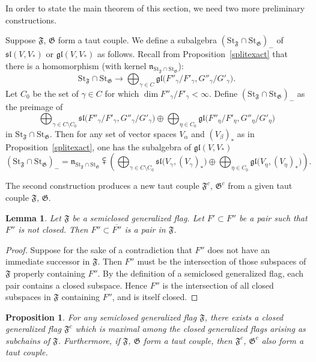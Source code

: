 \documentclass{article}
\newcommand {\St} {\mathrm{St}}
\def\gl{\mathfrak {gl}}
\def\n{\mathfrak {n}}
\def\sl{\mathfrak{sl}}
\def\F{\mathfrak{F}}
\def\G{\mathfrak{G}}
\newtheorem{lemma}[thm]{Lemma}
\newtheorem{prop}[thm]{Proposition}
\begin{document}
In order to state the main theorem of this section, we need two more preliminary constructions. 

Suppose $\F$, $\G$ form a taut couple.  
We define a subalgebra $(\St_\F \cap \St_\G)_-$ of $\sl(V,V_*)$ or $\gl(V,V_*)$ as follows.  Recall from Proposition~\ref{splitexact} that there is a homomorphism (with kernel $\n_{\St_\F \cap \St_\G}$):  $$\St_\F \cap \St_\G \longrightarrow \bigoplus_{\gamma \in C} \gl \big({F''_\gamma} / {F'_\gamma} , {G''_\gamma} / {G'_\gamma} \big).$$
Let $C_0$ be the set of $\gamma \in C$ for which $\dim {F''_\gamma} / {F'_\gamma} < \infty$. Define $(\St_\F \cap \St_\G)_-$ as the preimage of 
\[ 
\bigoplus_{\gamma \in C \setminus C_0} \sl \big({F''_\gamma} / {F'_\gamma} , {G''_\gamma} / {G'_\gamma}
 \big) \oplus \bigoplus_{\eta \in C_0}  \gl \big( {F''_\eta} / {F'_\eta} , {G''_\eta} / {G'_\eta}
 \big)
\]
in $\St_\F\cap\St_\G$. Then for any set of vector spaces $V_\alpha$ and $(V_\beta)_*$ as in Proposition~\ref{splitexact}, one has the subalgebra of $\gl(V,V_*)$
$$(\St_\F \cap \St_\G)_- = \n_{\St_\F \cap \St_\G} \subsetplus  \left( \bigoplus_{\gamma \in C \setminus C_0} \sl \big( V_\gamma, (V_\gamma)_* \big) \oplus \bigoplus_{\eta \in C_0}  \gl \big( V_\eta , (V_\eta)_* \big) \right).$$ 

The second construction produces a new taut couple $\F^c$, $\G^c$ from a given taut couple $\F$, $\G$. 


\begin{lemma} \label{nonclosedsuccessor}
Let $\F$ be a semiclosed generalized flag.  Let $F' \subset F''$ be a pair such that $F''$ is not closed. Then $F'' \subset \overline{F''}$ is a pair in $\F$.  
\end{lemma}

\begin{proof}
Suppose for the sake of a contradiction that $F''$ does not have an immediate successor in $\F$.  Then $F''$ must be the intersection of those subspaces of $\F$ properly containing $F''$.  By the definition of a semiclosed generalized flag, each pair contains a closed subspace.  Hence $F''$ is the intersection of all closed subspaces in $\F$ containing $F''$, and is itself closed.
\end{proof}


\begin{prop} \label{primeflags}
For any semiclosed generalized flag $\F$, there exists a closed generalized flag $\F^c$ which is maximal among the closed generalized flags arising as subchains of $\F$.  Furthermore, if $\F$, $\G$ form a taut couple, then $\F^c$, $\G^c$ also form a taut couple. 
\end{prop}
\end{document}
